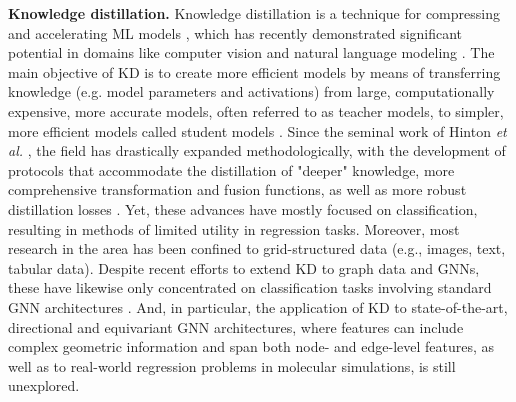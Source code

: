 \documentclass{article}
\begin{document}
\textbf{Knowledge distillation.}
Knowledge distillation is a technique for compressing and accelerating ML models \cite{cheng2018model}, which has recently demonstrated significant potential in domains like computer vision \cite{wang2021knowledge} and natural language modeling \cite{sanh2019distilbert}. The main objective of KD is to create more efficient models by means of transferring knowledge (e.g. model parameters and activations) from large, computationally expensive, more accurate models, often referred to as teacher models, to simpler, more efficient models called student models \cite{gou2021knowledge}. Since the seminal work of Hinton \textit{et al.} \cite{hinton_distilling_2015}, the field has drastically expanded methodologically, with the development of protocols that accommodate the distillation of "deeper" knowledge, more comprehensive transformation and fusion functions, as well as more robust distillation losses \cite{gou2021knowledge, hu2022teacher}. Yet, these advances have mostly focused on classification, resulting in methods of limited utility in regression tasks. Moreover, most research in the area has been confined to grid-structured data (e.g., images, text, tabular data). Despite recent efforts to extend KD to graph data and GNNs, these have likewise only concentrated on classification tasks involving standard GNN architectures \cite{tian2023knowledge}. And, in particular, the application of KD to state-of-the-art, directional and equivariant GNN architectures, where features can include complex geometric information and span both node- and edge-level features, as well as to real-world regression problems in molecular simulations, is still unexplored.

\end{document}

